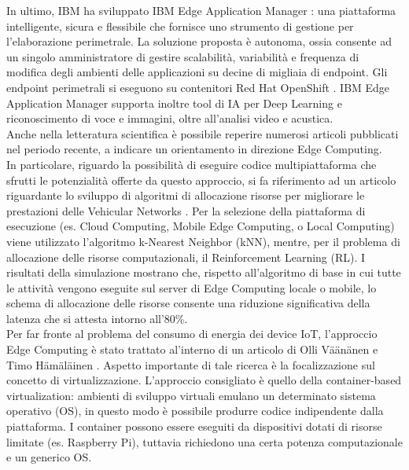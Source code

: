 In ultimo, IBM ha sviluppato IBM Edge Application Manager \cite{IBM}: una piattaforma intelligente, sicura e flessibile che fornisce uno strumento di gestione per l'elaborazione perimetrale. La soluzione proposta è autonoma, ossia consente ad un singolo amministratore di gestire scalabilità, variabilità e frequenza di modifica degli ambienti delle applicazioni su decine di migliaia di endpoint. Gli endpoint perimetrali si eseguono su contenitori Red Hat OpenShift \cite{redhat}. IBM Edge Application Manager supporta inoltre tool di IA per Deep Learning e riconoscimento di voce e immagini, oltre all'analisi video e acustica.\\
Anche nella letteratura scientifica è possibile reperire numerosi articoli pubblicati nel periodo recente, a indicare un orientamento in direzione Edge Computing.\\
In particolare, riguardo la possibilità di eseguire codice multipiattaforma che sfrutti le potenzialità offerte da questo approccio, si fa riferimento ad un articolo riguardante lo sviluppo di algoritmi di allocazione risorse per migliorare le prestazioni delle Vehicular Networks \cite{VN}. Per la selezione della piattaforma di esecuzione (es. Cloud Computing, Mobile Edge Computing, o Local Computing) viene utilizzato l'algoritmo k-Nearest Neighbor (kNN), mentre, per il problema di allocazione delle risorse computazionali, il Reinforcement Learning (RL). I risultati della simulazione mostrano che, rispetto all'algoritmo di base in cui tutte le attività vengono eseguite sul server di Edge Computing locale o mobile, lo schema di allocazione delle risorse consente una riduzione significativa della latenza che si attesta intorno all'80\%.\\
Per far fronte al problema del consumo di energia dei device IoT, l'approccio Edge Computing è stato trattato al'interno di un articolo di Olli Väänänen e Timo Hämäläinen \cite{energyIoT}. Aspetto importante di tale ricerca è la focalizzazione sul concetto di virtualizzazione. L'approccio consigliato è quello della container-based virtualization: ambienti di sviluppo virtuali emulano un determinato sistema operativo (OS), in questo modo è possibile produrre codice indipendente dalla piattaforma. I container possono essere eseguiti da dispositivi dotati di risorse limitate (es. Raspberry Pi), tuttavia richiedono una certa potenza computazionale e un generico OS.\\
